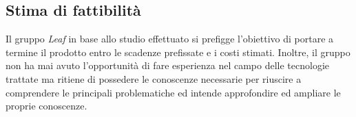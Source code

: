 \documentclass[../StudioDiFattibilita.tex]{subfiles}
\begin{document}
	\subsection{Stima di fattibilità}
	Il gruppo \textit{Leaf} in base allo studio effettuato si prefigge l'obiettivo di portare a termine il prodotto entro le scadenze prefissate e i costi stimati.
	Inoltre, il gruppo non ha mai avuto l'opportunità di fare esperienza nel campo delle tecnologie trattate ma ritiene di possedere le conoscenze necessarie per riuscire a comprendere le principali problematiche ed intende approfondire ed ampliare le proprie conoscenze.
\end{document}

